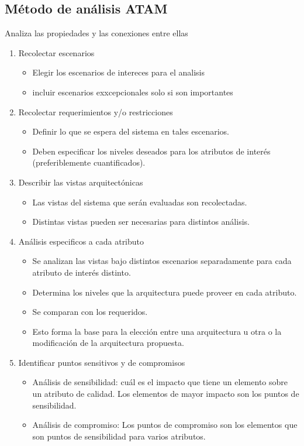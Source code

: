   \subsection{Método de análisis ATAM}
    Analiza las propiedades y las conexiones entre ellas

    \begin{enumerate}
      \item Recolectar escenarios
            \begin{itemize}
              \item Elegir los escenarios de intereces para el analisis
              \item incluir escenarios exxcepcionales solo si son importantes
            \end{itemize}
      \item Recolectar requerimientos y/o restricciones
            \begin{itemize}
              \item Definir lo que se espera del sistema en tales escenarios.
              \item Deben especificar los niveles deseados para los atributos de interés (preferiblemente
                    cuantificados).
            \end{itemize}
      \item Describir las vistas arquitectónicas
            \begin{itemize}
              \item Las vistas del sistema que serán evaluadas son recolectadas.
              \item Distintas vistas pueden ser necesarias para distintos análisis.
            \end{itemize}
      \item Análisis especificos a cada atributo
            \begin{itemize}
              \item Se analizan las vistas bajo distintos escenarios separadamente para cada atributo de interés
                    distinto.
              \item Determina los niveles que la arquitectura puede proveer en cada atributo.
              \item Se comparan con los requeridos.
              \item Esto forma la base para la elección entre una arquitectura u otra o la modificación de la
                    arquitectura propuesta.
            \end{itemize}
      \item Identificar puntos sensitivos y de compromisos
            \begin{itemize}
              \item Análisis de sensibilidad: cuál es el impacto que tiene un elemento sobre un atributo de calidad.
                    Los elementos de mayor impacto son los puntos de sensibilidad.
              \item Análisis de compromiso: Los puntos de compromiso son los elementos que son puntos de sensibilidad
                    para varios atributos. 
            \end{itemize}
    \end{enumerate}